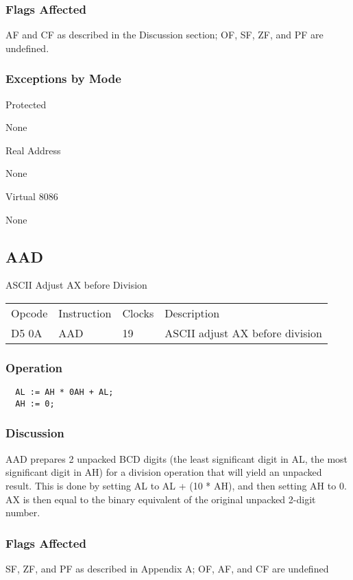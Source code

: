 \subsubsection{Flags Affected}
AF and CF as described in the Discussion section; OF, SF, ZF, and PF are undefined.

\subsubsection{Exceptions by Mode}

Protected

None

Real Address

None

Virtual 8086

None

\subsection*{AAD} 

ASCII Adjust AX before Division 

\begin{tabular}{l l l l}
Opcode & Instruction & Clocks & Description\\
D5 0A & AAD & 19 & ASCII adjust AX before division\\
\end{tabular}

\subsubsection{Operation}
\begin{verbatim}
  AL := AH * 0AH + AL; 
  AH := 0;
\end{verbatim}

\subsubsection{Discussion}

AAD prepares 2 unpacked BCD digits (the least significant digit in AL, the most significant digit in AH) for a division operation that will yield an unpacked result. This is done by setting AL to AL + (10 * AH), and then setting AH to 0. AX is then equal to the binary equivalent of the original unpacked 2-digit number.

\subsubsection{Flags Affected}
SF, ZF, and PF as described in Appendix A; OF, AF, and CF are undefined

